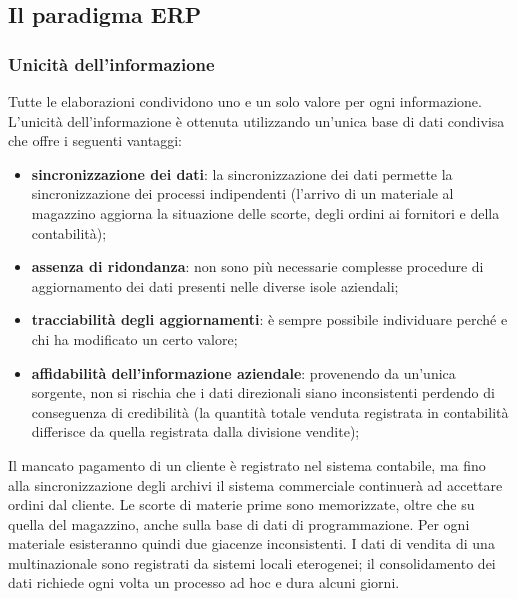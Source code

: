 \subsection{Il paradigma ERP}\label{sub:il_paradigma_erp} %
\subsubsection{Unicità dell'informazione}\label{sub:erp_unicit_dell_informazione} %
Tutte le elaborazioni condividono uno e un solo valore per ogni informazione.
L'unicità dell'informazione è ottenuta utilizzando un'unica base di dati condivisa che offre i seguenti vantaggi:
\begin{itemize}
    \item \textbf{sincronizzazione dei dati}: la sincronizzazione dei dati permette la sincronizzazione dei processi indipendenti (l'arrivo di un materiale al magazzino aggiorna la situazione delle scorte, degli ordini ai fornitori e della contabilità);
    \item \textbf{assenza di ridondanza}: non sono più necessarie complesse procedure di aggiornamento dei dati presenti nelle diverse isole aziendali;
    \item \textbf{tracciabilità degli aggiornamenti}: è sempre possibile individuare perché e chi ha modificato un certo valore;
    \item \textbf{affidabilità dell'informazione aziendale}: provenendo da un'unica sorgente, non si rischia che i dati direzionali siano inconsistenti perdendo di conseguenza di credibilità (la quantità totale venduta registrata in contabilità differisce da quella registrata dalla divisione vendite);
\end{itemize}
\begin{note}
    Il mancato pagamento di un cliente è registrato nel sistema contabile, ma fino alla sincronizzazione degli archivi il sistema commerciale continuerà ad accettare ordini dal cliente.
    \emptyln{}
    Le scorte di materie prime sono memorizzate, oltre che su quella del magazzino, anche sulla base di dati di programmazione.
    Per ogni materiale esisteranno quindi due giacenze inconsistenti.
    \emptyln{}
    I dati di vendita di una multinazionale sono registrati da sistemi locali eterogenei; il consolidamento dei dati richiede ogni volta un processo ad hoc e dura alcuni giorni.
\end{note}
%

